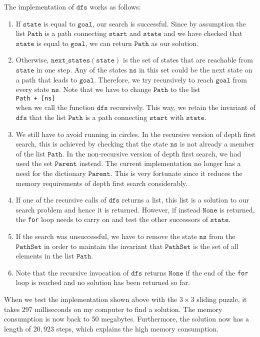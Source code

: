 The implementation of $\texttt{dfs}$ works as follows:
\begin{enumerate}
\item If $\texttt{state}$ is equal to $\texttt{goal}$, our search is successful. Since by assumption
      the list $\texttt{Path}$ is a path connecting $\texttt{start}$ and $\texttt{state}$ and we
      have checked that $\texttt{state}$ is equal to $\texttt{goal}$, we can return $\texttt{Path}$ as our solution.
\item Otherwise, $\texttt{next\_states}(\mathtt{state})$ is the set of states that are reachable from $\texttt{state}$
      in one step.  Any of the states $\texttt{ns}$ in this set could be the next state on a path
      that leads to $\texttt{goal}$.  Therefore, we try recursively to reach $\texttt{goal}$ from
      every state $\texttt{ns}$.  Note that we have to change $\texttt{Path}$ to the list
      \\[0.2cm]
      \hspace*{1.3cm}
      \texttt{Path + [ns]}
      \\[0.2cm]
      when we call the function $\texttt{dfs}$ recursively.  This way, we retain the invariant of
      $\texttt{dfs}$ that the list $\texttt{Path}$ is a path connecting $\texttt{start}$ with $\texttt{state}$.
\item We still have to avoid running in circles.  In the recursive version of depth first search,
      this is achieved by checking that the state $\texttt{ns}$ is not already a member of the list $\texttt{Path}$.  In the
      non-recursive version of depth first search, we had used the set $\texttt{Parent}$ instead.
      The current implementation no longer has a need for the dictionary $\texttt{Parent}$.  This is very
      fortunate since it reduces the memory requirements of depth first search considerably.
\item If one of the recursive calls of $\texttt{dfs}$ returns a list, this list is a solution to our
      search problem and hence it is returned.  However, if instead 
      $\texttt{None}$ is returned, the \texttt{for} loop needs to carry on and test the other
      successors of $\texttt{state}$.
\item If the search was unsuccessful, we have to remove the state $\texttt{ns}$ from the $\texttt{PathSet}$
      in order to maintain the invariant that $\texttt{PathSet}$ is the set of all elements in the list
      $\texttt{Path}$.
\item Note that the recursive invocation of $\texttt{dfs}$ returns $\mathtt{None}$ if the end of the
      \texttt{for} loop is reached and no solution has been returned so far.  
\end{enumerate}
When we test the implementation shown above with the $3 \times 3$ sliding puzzle, it takes 297 milliseconds 
on my computer to find a solution.  The memory consumption is now back to 50 megabytes.  Furthermore, the
solution now has a length of $20,923$ steps, which explains the high memory consumption.  

